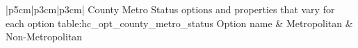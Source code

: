 \begin{customLongTable}{ |p{5cm}|p{3cm}|p{3cm}| }
{County Metro Status options and properties that vary for each option} {table:hc_opt_county_metro_status}
{Option name & Metropolitan & Non-Metropolitan}
\endhead
\hline
\end{customLongTable}
